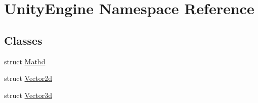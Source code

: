 \hypertarget{namespace_unity_engine}{}\section{Unity\+Engine Namespace Reference}
\label{namespace_unity_engine}
\subsection*{Classes}
\begin{DoxyCompactItemize}
\item 
struct \hyperlink{struct_unity_engine_1_1_mathd}{Mathd}
\item 
struct \hyperlink{struct_unity_engine_1_1_vector2d}{Vector2d}
\item 
struct \hyperlink{struct_unity_engine_1_1_vector3d}{Vector3d}
\end{DoxyCompactItemize}
